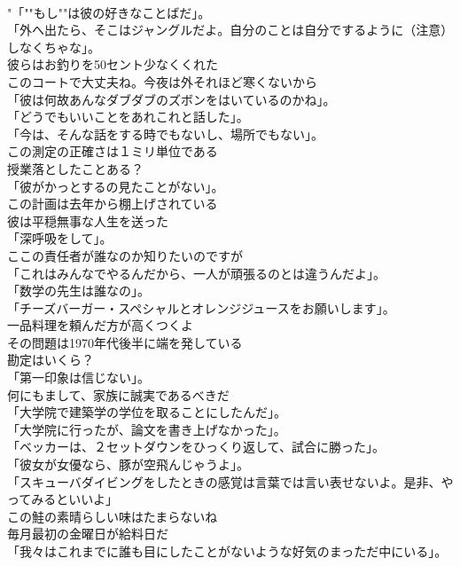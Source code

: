 \documentclass[8pt]{extreport}
\begin{document}
\begin{CJK}{UTF8}{min}
\\	"「""もし""は彼の好きなことばだ」。
\\	「外へ出たら、そこはジャングルだよ。自分のことは自分でするように（注意）しなくちゃな」。	
\\	彼らはお釣りを50セント少なくくれた	
\\	このコートで大丈夫ね。今夜は外それほど寒くないから	
\\	「彼は何故あんなダブダブのズボンをはいているのかね」。	
\\	「どうでもいいことをあれこれと話した」。	
\\	「今は、そんな話をする時でもないし、場所でもない」。	
\\	この測定の正確さは１ミリ単位である	
\\	授業落としたことある？	
\\	「彼がかっとするの見たことがない」。	
\\	この計画は去年から棚上げされている	
\\	彼は平穏無事な人生を送った	
\\	「深呼吸をして」。	
\\	ここの責任者が誰なのか知りたいのですが	
\\	「これはみんなでやるんだから、一人が頑張るのとは違うんだよ」。	
\\	「数学の先生は誰なの」。	
\\	「チーズバーガー・スペシャルとオレンジジュースをお願いします」。	
\\	一品料理を頼んだ方が高くつくよ	
\\	その問題は1970年代後半に端を発している	
\\	勘定はいくら？	
\\	「第一印象は信じない」。	
\\	何にもまして、家族に誠実であるべきだ	
\\	「大学院で建築学の学位を取ることにしたんだ」。	
\\	「大学院に行ったが、論文を書き上げなかった」。	
\\	「ベッカーは、２セットダウンをひっくり返して、試合に勝った」。	
\\	「彼女が女優なら、豚が空飛んじゃうよ」。	
\\	「スキューバダイビングをしたときの感覚は言葉では言い表せないよ。是非、やってみるといいよ」	
\\	この鮭の素晴らしい味はたまらないね	
\\	毎月最初の金曜日が給料日だ	
\\	「我々はこれまでに誰も目にしたことがないような好気のまっただ中にいる」。	

\end{CJK}
\end{document}
